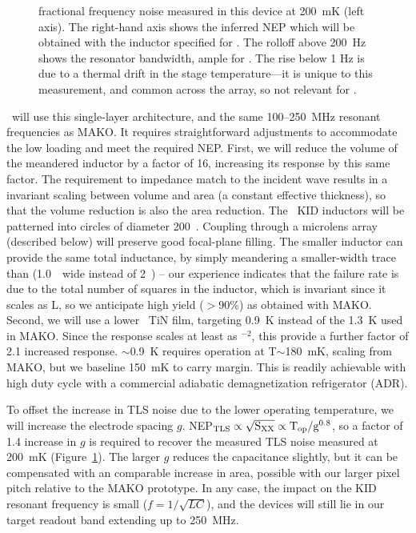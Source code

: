 \begin{figure}[t!]
\begin{center}
{fractional frequency noise measured in this device at 200~mK (left axis).  The right-hand axis shows the inferred NEP which will be obtained with the inductor specified for \name.  The rolloff above 200~Hz shows the resonator bandwidth, ample for \name. The rise below 1 Hz is due to a thermal drift in the stage temperature---it is unique to this measurement, and common across the array, so not relevant for \name. }
\linefig\vspace{-0.35in} \label{fig:makonew}
\end{center}
\end{figure}

\vspace{0.05in}{\bf Pixel design for \name.} \name\ will use this single-layer architecture, and the same 100--250~MHz resonant frequencies as MAKO.  It requires straightforward adjustments to accommodate the low loading and meet the required NEP.  First, we will reduce the volume of the meandered inductor by a factor of 16, increasing its response by this same factor.  The requirement to impedance match to the incident wave results in a invariant scaling between volume and area (a constant effective thickness), so that the volume reduction is also the area reduction.  The \name\ KID inductors will be patterned into circles of diameter 200~\mum.  Coupling through a microlens array (described below) will preserve good focal-plane filling.  The smaller inductor can provide the same total inductance, by simply meandering a smaller-width trace than (1.0~\mum\ wide instead of 2~\mum) -- our experience indicates that the failure rate is due to the total number of squares in the inductor, which is invariant 
since it scales as L, so we anticipate high yield ($>$90\%) as obtained with MAKO.  Second, we will use a lower \Tc\ TiN film, targeting 0.9~K instead of the 1.3~K used in MAKO.   Since the response scales at least as \Tc$^{-2}$, this provide a further factor of 2.1 increased response.  \Tc$\sim$0.9~K requires operation at T$\sim$180~mK, scaling from MAKO, but we baseline 150~mK to carry margin.  This is readily achievable with high duty cycle with a commercial adiabatic demagnetization refrigerator (ADR).   

To offset the increase in TLS noise due to the lower operating temperature, we will increase the electrode spacing $g$.  NEP$_{\rm TLS} \propto \sqrt{\rm S_{\rm XX}} \propto \rm T_{\rm op} / g^{0.8}$, so a factor of 1.4 increase in $g$ is required to recover the measured TLS noise measured at 200~mK (Figure~\ref{fig:makonew}).   The larger $g$ reduces the capacitance slightly, but it can be compensated with an comparable increase in area, possible with our larger pixel pitch relative to the MAKO prototype.  In any case, the impact on the KID resonant frequency is small ($f=1/\sqrt{LC}$), and the devices will still lie in our target readout band extending up to 250~MHz.

